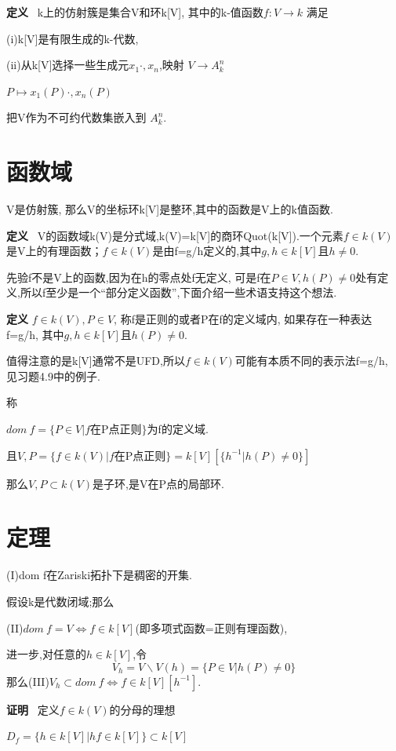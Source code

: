 \documentclass[UTF8]{book}
\begin{document}
		\textbf{定义} \ k上的仿射簇是集合V和环k[V], 其中的k-值函数$f:V\rightarrow k$ 满足

		(i)k[V]是有限生成的k-代数,

		(ii)从k[V]选择一些生成元$x_{1}  \cdot, x_{n}$,映射
		\center $ V \rightarrow  A^{n}_{k}$


		$P\mapsto x_{1}(P)  \cdot, x_{n}(P)$

		\justifying
		把V作为不可约代数集嵌入到 $A^{n}_{k}$.
		\section{函数域}V是仿射簇, 那么V的坐标环k[V]是整环,其中的函数是V上的k值函数.

		\textbf{定义} \ V的函数域k(V)是分式域,k(V)=k[V]的商环Quot(k[V]).一个元素$f\in k(V)$是V上的有理函数；$f\in k(V)$是由f=g/h定义的,其中$g,h\in k[V]$且$h\neq 0$.

		先验f不是V上的函数,因为在h的零点处f无定义, 可是f在$P\in V,h(P)\neq 0$处有定义,所以f至少是一个“部分定义函数”,下面介绍一些术语支持这个想法.

		\textbf{定义} $f\in k(V),P\in V$, 称f是正则的或者P在f的定义域内, 如果存在一种表达f=g/h, 其中$g,h\in k[V]$且$h(P)\neq 0$.

		值得注意的是k[V]通常不是UFD,所以$f\in k(V)$可能有本质不同的表示法f=g/h, 见习题4.9中的例子.

		称

		\center  $dom \ f=\{P\in V\vert f$在P点正则$\}$为f的定义域.

						且$V,P=\{f\in k(V) \vert f$在P点正则$\}=k[V][\{h^{-1}\vert h(P)\neq 0\}]$

		\justifying
		那么$V,P\subset k(V)$是子环,是V在P点的局部环.
	\section{定理}
		(I)dom f在Zariski拓扑下是稠密的开集.

		假设k是代数闭域;那么

		(II)$dom \ f=V\iff f\in k[V]$(即多项式函数=正则有理函数),

		进一步,对任意的$h\in k[V]$,令
		\begin{equation*}
		V_{h}=V\backslash V(h)=\{P\in V \vert h(P)\neq 0\}
		\end{equation*}
		那么(III)$V_{h}\subset dom \ f \iff f\in k[V][h^{-1}]$.

		\textbf{证明} \ 定义$f\in k(V)$的分母的理想

		\center $ D_{f}=\{ h\in k[V] \vert hf\in k[V] \}\subset k[V]$
\end{document}
